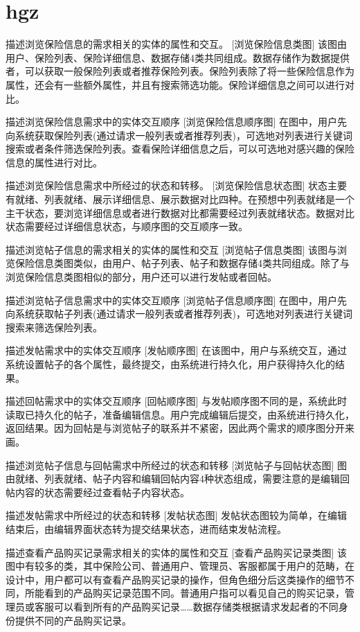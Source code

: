 \section{hgz}
描述浏览保险信息的需求相关的实体的属性和交互。
[浏览保险信息类图]
该图由用户、保险列表、保险详细信息、数据存储4类共同组成。数据存储作为数据提供者，可以获取一般保险列表或者推荐保险列表。保险列表除了将一些保险信息作为属性，还会有一些额外属性，并且有搜索筛选功能。保险详细信息之间可以进行对比。

描述浏览保险信息需求中的实体交互顺序
[浏览保险信息顺序图]
在图中，用户先向系统获取保险列表(通过请求一般列表或者推荐列表)，可选地对列表进行关键词搜索或者条件筛选保险列表。查看保险详细信息之后，可以可选地对感兴趣的保险信息的属性进行对比。

描述浏览保险信息需求中所经过的状态和转移。
[浏览保险信息状态图]
状态主要有就绪、列表就绪、展示详细信息、展示数据对比四种。在预想中列表就绪是一个主干状态，要浏览详细信息或者进行数据对比都需要经过列表就绪状态。数据对比状态需要经过详细信息状态，与顺序图的交互顺序一致。

描述浏览帖子信息的需求相关的实体的属性和交互
[浏览帖子信息类图]
该图与浏览保险信息类图类似，由用户、帖子列表、帖子和数据存储4类共同组成。除了与浏览保险信息类图相似的部分，用户还可以进行发帖或者回帖。

描述浏览帖子信息需求中的实体交互顺序
[浏览帖子信息顺序图]
在图中，用户先向系统获取帖子列表(通过请求一般列表或者推荐列表)，可选地对列表进行关键词搜索来筛选保险列表。

描述发帖需求中的实体交互顺序
[发帖顺序图]
在该图中，用户与系统交互，通过系统设置帖子的各个属性，最终提交，由系统进行持久化，用户获得持久化的结果。

描述回帖需求中的实体交互顺序
[回帖顺序图]
与发帖顺序图不同的是，系统此时读取已持久化的帖子，准备编辑信息。用户完成编辑后提交，由系统进行持久化，返回结果。因为回帖是与浏览帖子的联系并不紧密，因此两个需求的顺序图分开来画。

描述浏览帖子信息与回帖需求中所经过的状态和转移
[浏览帖子与回帖状态图]
图由就绪、列表就绪、帖子内容和编辑回帖内容4种状态组成，需要注意的是编辑回帖内容的状态需要经过查看帖子内容状态。

描述发帖需求中所经过的状态和转移
[发帖状态图]
发帖状态图较为简单，在编辑结束后，由编辑界面状态转为提交结果状态，进而结束发帖流程。

描述查看产品购买记录需求相关的实体的属性和交互
[查看产品购买记录类图]
该图中有较多的类，其中保险公司、普通用户、管理员、客服都属于用户的范畴，在设计中，用户都可以有查看产品购买记录的操作，但角色细分后这类操作的细节不同，所能看到的产品购买记录范围不同。普通用户指可以看见自己的购买记录，管理员或客服可以看到所有的产品购买记录……数据存储类根据请求发起者的不同身份提供不同的产品购买记录。

